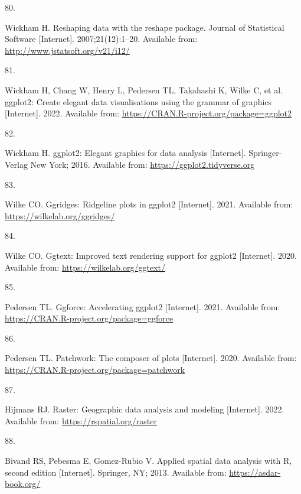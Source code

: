 \documentclass[10pt,a4paper]{article}
\newlength{\cslhangindent}
\newlength{\csllabelwidth}
\newlength{\cslentryspacingunit} %
\newenvironment{CSLReferences}[2] %
 {%
  \setlength{\parindent}{0pt}
  \ifodd #1
  \let\oldpar\par
  \def\par{\hangindent=\cslhangindent\oldpar}
  \fi
  \setlength{\parskip}{#2\cslentryspacingunit}
 }%
 {}
\newcommand{\CSLLeftMargin}[1]{\parbox[t]{\csllabelwidth}{#1}}
\newcommand{\CSLRightInline}[1]{\parbox[t]{\linewidth - \csllabelwidth}{#1}\break}
\begin{document}
\begin{CSLReferences}{0}{0}
\leavevmode{}%
\CSLLeftMargin{80. }
\CSLRightInline{Wickham H. Reshaping data with the {reshape} package. Journal of Statistical Software {[}Internet{]}. 2007;21(12):1--20. Available from: \url{http://www.jstatsoft.org/v21/i12/}}

\leavevmode{}%
\CSLLeftMargin{81. }
\CSLRightInline{Wickham H, Chang W, Henry L, Pedersen TL, Takahashi K, Wilke C, et al. ggplot2: Create elegant data visualisations using the grammar of graphics {[}Internet{]}. 2022. Available from: \url{https://CRAN.R-project.org/package=ggplot2}}

\leavevmode{}%
\CSLLeftMargin{82. }
\CSLRightInline{Wickham H. ggplot2: Elegant graphics for data analysis {[}Internet{]}. Springer-Verlag New York; 2016. Available from: \url{https://ggplot2.tidyverse.org}}

\leavevmode{}%
\CSLLeftMargin{83. }
\CSLRightInline{Wilke CO. Ggridges: Ridgeline plots in ggplot2 {[}Internet{]}. 2021. Available from: \url{https://wilkelab.org/ggridges/}}

\leavevmode{}%
\CSLLeftMargin{84. }
\CSLRightInline{Wilke CO. Ggtext: Improved text rendering support for ggplot2 {[}Internet{]}. 2020. Available from: \url{https://wilkelab.org/ggtext/}}

\leavevmode{}%
\CSLLeftMargin{85. }
\CSLRightInline{Pedersen TL. Ggforce: Accelerating ggplot2 {[}Internet{]}. 2021. Available from: \url{https://CRAN.R-project.org/package=ggforce}}

\leavevmode{}%
\CSLLeftMargin{86. }
\CSLRightInline{Pedersen TL. Patchwork: The composer of plots {[}Internet{]}. 2020. Available from: \url{https://CRAN.R-project.org/package=patchwork}}

\leavevmode{}%
\CSLLeftMargin{87. }
\CSLRightInline{Hijmans RJ. Raster: Geographic data analysis and modeling {[}Internet{]}. 2022. Available from: \url{https://rspatial.org/raster}}

\leavevmode{}%
\CSLLeftMargin{88. }
\CSLRightInline{Bivand RS, Pebesma E, Gomez-Rubio V. Applied spatial data analysis with {R}, second edition {[}Internet{]}. Springer, NY; 2013. Available from: \url{https://asdar-book.org/}}


\end{CSLReferences}
\end{document}
